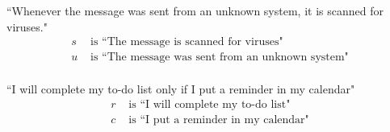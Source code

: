 \documentclass[12pt, oneside]{article}
\begin{document}
\begin{multicols}{2}
``Whenever the message was sent from an unknown system, it is scanned for viruses."
\columnbreak
\begin{align*}
s &\text{ is  ``The message is scanned for viruses"} \\
u &\text{ is  ``The message was sent from an unknown system"} \\
\end{align*}
\end{multicols}
\vfill

\begin{multicols}{2}
``I will complete my to-do list only if I put a reminder in my calendar"
\columnbreak
\begin{align*}
r &\text{ is  ``I will complete my to-do list"} \\
c &\text{ is  ``I put a reminder in my calendar"} \\
\end{align*}
\end{multicols}
\vfill
\end{document}
